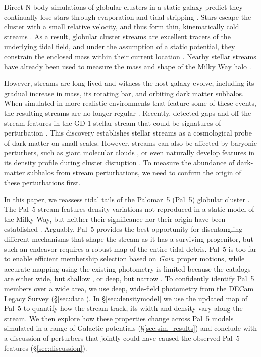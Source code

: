 \documentclass[twocolumn]{aastex62}
\newcommand{\gaia}{\textsl{Gaia}}
\begin{document}
Direct N-body simulations of globular clusters in a static galaxy predict they continually lose stars through evaporation and tidal stripping \citep[e.g.,][]{Baumgardt:2003}.
Stars escape the cluster with a small relative velocity, and thus form thin, kinematically cold streams \citep[e.g.,][]{Combes:1999}.
As a result, globular cluster streams are excellent tracers of the underlying tidal field, and under the assumption of a static potential, they constrain the enclosed mass within their current location \citep{Bonaca:2018}.
Nearby stellar streams have already been used to measure the mass and shape of the Milky Way halo \citep[e.g.,][]{Koposov:2010, Kupper:2015, Bovy:2016}.

However, streams are long-lived and witness the host galaxy evolve, including its gradual increase in mass, its rotating bar, and orbiting dark matter subhalos.
When simulated in more realistic environments that feature some of these events, the resulting streams are no longer regular \citep[e.g.,][]{Bonaca:2014, Ngan:2015, Price-Whelan:2016b}.
Recently, \citet{Price-Whelan:2018} detected gaps and off-the-stream features in the GD-1 stellar stream that could be signatures of perturbation \citep{Bonaca:2018b}.
This discovery establishes stellar streams as a cosmological probe of dark matter on small scales.
However, streams can also be affected by baryonic perturbers, such as giant molecular clouds \citep{Amorisco:2016}, or even naturally develop features in its density profile during cluster disruption \citep[e.g.,][]{Kupper:2008, Just:2009}.
To measure the abundance of dark-matter subhalos from stream perturbations, we need to confirm the origin of these perturbations first.

In this paper, we reassess tidal tails of the Palomar~5 (Pal~5) globular cluster \citep{Odenkirchen:2001, Rockosi:2002}.
The Pal~5 stream features density variations not reproduced in a static model of the Milky Way, but neither their significance nor their origin have been established \citep{Carlberg:2012, Bernard:2016, Ibata:2016, Erkal:2017}.
Arguably, Pal~5 provides the best opportunity for disentangling different mechanisms that shape the stream as it has a surviving progenitor, but such an endeavor requires a robust map of the entire tidal debris.
Pal~5 is too far to enable efficient membership selection based on \gaia\ proper motions, while accurate mapping using the existing photometry is limited because the catalogs are either wide, but shallow \citep{Bernard:2016}, or deep, but narrow \citep{Ibata:2016}.
To confidently identify Pal~5 members over a wide area, we use deep, wide-field photometry from the DECam Legacy Survey (\S\ref{sec:data}).
In \S\ref{sec:densitymodel} we use the updated map of Pal~5 to quantify how the stream track, its width and density vary along the stream.
We then explore how these properties change across Pal~5 models simulated in a range of Galactic potentials (\S\ref{sec:sim_results}) and conclude with a discussion of perturbers that jointly could have caused the observed Pal~5 features (\S\ref{sec:discussion}).
\end{document}
